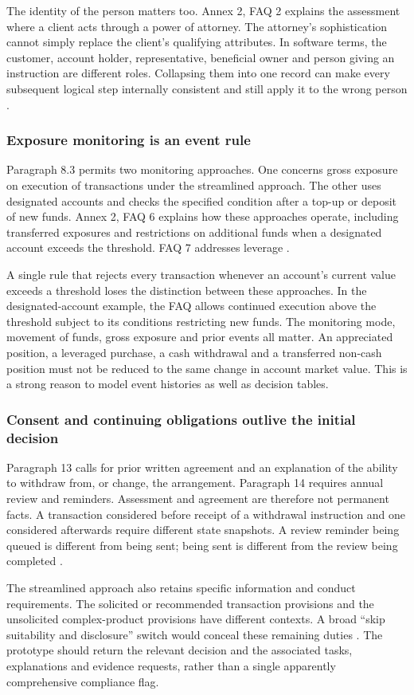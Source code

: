 \documentclass[12pt,a4paper,oneside,openany]{book}
\newcommand{\caseheading}[1]{\subsubsection*{#1}}
\begin{document}
The identity of the person matters too. Annex 2, FAQ 2 explains the assessment
where a client acts through a power of attorney. The attorney's sophistication
cannot simply replace the client's qualifying attributes. In software terms,
the customer, account holder, representative, beneficial owner and person giving
an instruction are different roles. Collapsing them into one record can make
every subsequent logical step internally consistent and still apply it to the
wrong person \citep[Annex 2, FAQ 2]{sfcspiannex2}.

\caseheading{Exposure monitoring is an event rule}
Paragraph 8.3 permits two monitoring approaches. One concerns gross exposure on
execution of transactions under the streamlined approach. The other uses
designated accounts and checks the specified condition after a top-up or deposit
of new funds. Annex 2, FAQ 6 explains how these approaches operate, including
transferred exposures and restrictions on additional funds when a designated
account exceeds the threshold. FAQ 7 addresses leverage
\citep[Annex 1, para.~8.3; Annex 2, FAQs 6--7]{sfcspiannex1,sfcspiannex2}.

A single rule that rejects every transaction whenever an account's current value
exceeds a threshold loses the distinction between these approaches. In the
designated-account example, the FAQ allows continued execution above the
threshold subject to its conditions restricting new funds. The monitoring mode,
movement of funds, gross exposure and prior events all matter. An appreciated
position, a leveraged purchase, a cash withdrawal and a transferred non-cash
position must not be reduced to the same change in account market value. This is
a strong reason to model event histories as well as decision tables.

\caseheading{Consent and continuing obligations outlive the initial decision}
Paragraph 13 calls for prior written agreement and an explanation of the ability
to withdraw from, or change, the arrangement. Paragraph 14 requires annual review
and reminders. Assessment and agreement are therefore not permanent facts. A
transaction considered before receipt of a withdrawal instruction and one
considered afterwards require different state snapshots. A review reminder being
queued is different from being sent; being sent is different from the review
being completed \citep[Annex 1, paras.~12--14]{sfcspiannex1}.

The streamlined approach also retains specific information and conduct
requirements. The solicited or recommended transaction provisions and the
unsolicited complex-product provisions have different contexts. A broad
``skip suitability and disclosure'' switch would conceal these remaining duties
\citep[Annex 1, paras.~9--11]{sfcspiannex1}. The prototype should return the
relevant decision and the associated tasks, explanations and evidence requests,
rather than a single apparently comprehensive compliance flag.
\end{document}

